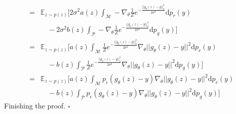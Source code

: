 \begin{Proof}
\begin{align*}
            ={}&\mathbb{E}_{z\sim p(z)}\biggl[ 2\sigma^2a(z)\int_\mathcal{M}-\nabla_\theta \frac{1}{Z}e^{-\frac{||g_\theta(z)-y||_2^2}{2\sigma^2}}\mathrm{d}p_r(y) \\
            &\quad -  2\sigma^2b(z)\int_\mathcal{P}-\nabla_\theta \frac{1}{Z}e^{-\frac{||g_\theta(z)-y||_2^2}{2\sigma^2}}\mathrm{d}p_g(y)  \biggr]\\
            ={}&\mathbb{E}_{z\sim p(z)}\biggl[ a(z)\int_\mathcal{M} \frac{1}{Z}e^{-\frac{||g_\theta(z)-y||_2^2}{2\sigma^2}}\nabla_\theta ||g_\theta(z)-y||^2 \mathrm{d}p_r(y) \\
            & \quad -  b(z)\int_\mathcal{P}\frac{1}{Z}e^{-\frac{||g_\theta(z)-y||_2^2}{2\sigma^2}}\nabla_\theta ||g_\theta(z)-y||^2\mathrm{d}p_g(y)  \biggr]\\
            ={}&\mathbb{E}_{z\sim p(z)}\biggl[ a(z)\int_\mathcal{M} p_\epsilon(g_\theta(z)-y) \nabla_\theta ||g_\theta(z)-y||^2 \mathrm{d}p_r(y) \\
            &\quad -  b(z)\int_\mathcal{P} p_\epsilon(g_\theta(z)-y)\nabla_\theta ||g_\theta(z)-y||^2\mathrm{d}p_g(y)  \biggr]
            \end{align*}
            Finishing the proof. $\square$
            \end{Proof}

